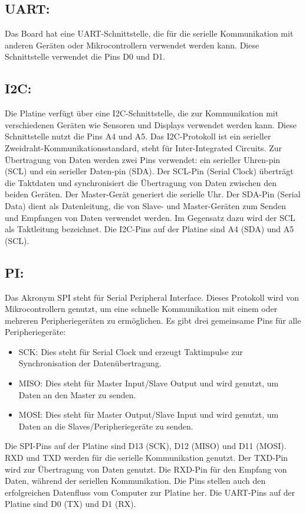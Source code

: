 \subsection{UART:}
Das Board hat eine UART-Schnittstelle, die für die serielle Kommunikation mit anderen Geräten oder Mikrocontrollern verwendet werden kann. Diese Schnittstelle verwendet die Pins D0 und D1.

\subsection{I2C:}
Die Platine verfügt über eine I2C-Schnittstelle, die zur Kommunikation mit verschiedenen Geräten wie Sensoren und Displays verwendet werden kann. Diese Schnittstelle nutzt die Pins A4 und A5. Das I2C-Protokoll ist ein serieller Zweidraht-Kommunikationsstandard, steht für Inter-Integrated Circuits. Zur Übertragung von Daten werden zwei Pins verwendet: ein serieller Uhren-pin (SCL) und ein serieller Daten-pin (SDA). Der SCL-Pin (Serial Clock) überträgt die Taktdaten und synchronisiert die Übertragung von Daten zwischen den beiden Geräten. Der Master-Gerät generiert die serielle Uhr. Der SDA-Pin (Serial Data) dient als Datenleitung, die von Slave- und Master-Geräten zum Senden und Empfangen von Daten verwendet werden. Im Gegensatz dazu wird der SCL als Taktleitung bezeichnet. Die I2C-Pins auf der Platine sind A4 (SDA) und A5 (SCL). 
\subsection{PI:}
Das Akronym SPI steht für Serial Peripheral Interface. Dieses Protokoll wird von Mikrocontrollern genutzt, um eine schnelle Kommunikation mit einem oder mehreren Peripheriegeräten zu ermöglichen. Es gibt drei gemeinsame Pins für alle Peripheriegeräte:
\begin{itemize}
	\item SCK: Dies steht für Serial Clock und erzeugt Taktimpulse zur Synchronisation der Datenübertragung.
	\item MISO: Dies steht für Master Input/Slave Output und wird genutzt, um Daten an den Master zu senden.
	\item MOSI: Dies steht für Master Output/Slave Input und wird genutzt, um Daten an die Slaves/Peripheriegeräte zu senden.
\end{itemize}
Die SPI-Pins auf der Platine sind D13 (SCK), D12 (MISO) und D11 (MOSI). RXD und TXD werden für die serielle Kommunikation genutzt. Der TXD-Pin wird zur Übertragung von Daten genutzt. Die RXD-Pin für den Empfang von Daten, während der seriellen Kommunikation. Die Pins stellen auch den erfolgreichen Datenfluss vom Computer zur Platine her. Die UART-Pins auf der Platine sind D0 (TX) und D1 (RX).
\\

